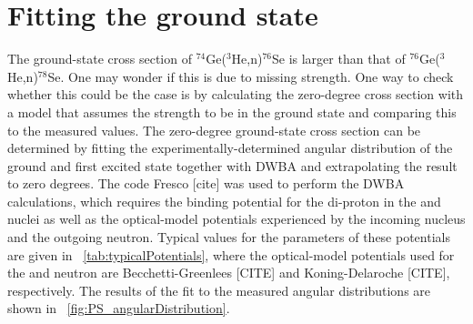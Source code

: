 \section{Fitting the \zp ground state}

The ground-state cross section of $^{74}$Ge($^3$He,n)$^{76}$Se is larger than that of $^{76}$Ge($^3$He,n)$^{78}$Se.  One may wonder if this is due to missing \zp strength.  One way to check whether this could be the case is by calculating the zero-degree cross section with a model that assumes the \zp strength to be in the ground state and comparing this to the measured values.  The zero-degree ground-state cross section can be determined by fitting the experimentally-determined angular distribution of the ground and first excited state together with DWBA and extrapolating the result to zero degrees.  The code Fresco [cite] was used to perform the DWBA calculations, which requires the binding potential for the di-proton in the  and  nuclei as well as the optical-model potentials experienced by the incoming  nucleus and the outgoing neutron.  Typical values for the parameters of these potentials are given in {\tab}~\ref{tab:typicalPotentials}, where the optical-model potentials used for the  and neutron are Becchetti-Greenlees [CITE] and Koning-Delaroche [CITE], respectively.  The results of the fit to the measured angular distributions are shown in {\fig}~\ref{fig:PS_angularDistribution}.
